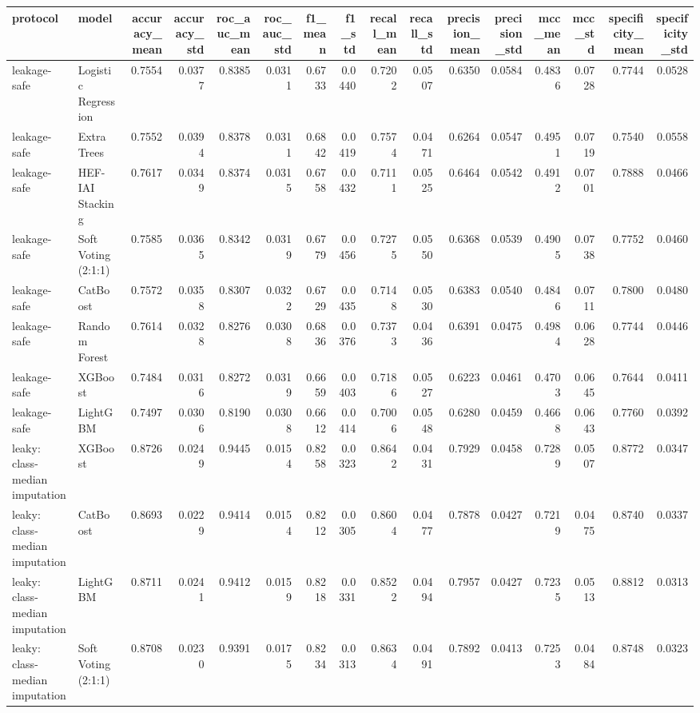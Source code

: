 \begin{tabular}{llrrrrrrrrrrrrrr}
\toprule
protocol & model & accuracy\_mean & accuracy\_std & roc\_auc\_mean & roc\_auc\_std & f1\_mean & f1\_std & recall\_mean & recall\_std & precision\_mean & precision\_std & mcc\_mean & mcc\_std & specificity\_mean & specificity\_std \\
\midrule
leakage-safe & Logistic Regression & 0.7554 & 0.0377 & 0.8385 & 0.0311 & 0.6733 & 0.0440 & 0.7202 & 0.0507 & 0.6350 & 0.0584 & 0.4836 & 0.0728 & 0.7744 & 0.0528 \\
leakage-safe & Extra Trees & 0.7552 & 0.0394 & 0.8378 & 0.0311 & 0.6842 & 0.0419 & 0.7574 & 0.0471 & 0.6264 & 0.0547 & 0.4951 & 0.0719 & 0.7540 & 0.0558 \\
leakage-safe & HEF-IAI Stacking & 0.7617 & 0.0349 & 0.8374 & 0.0315 & 0.6758 & 0.0432 & 0.7111 & 0.0525 & 0.6464 & 0.0542 & 0.4912 & 0.0701 & 0.7888 & 0.0466 \\
leakage-safe & Soft Voting (2:1:1) & 0.7585 & 0.0365 & 0.8342 & 0.0319 & 0.6779 & 0.0456 & 0.7275 & 0.0550 & 0.6368 & 0.0539 & 0.4905 & 0.0738 & 0.7752 & 0.0460 \\
leakage-safe & CatBoost & 0.7572 & 0.0358 & 0.8307 & 0.0322 & 0.6729 & 0.0435 & 0.7148 & 0.0530 & 0.6383 & 0.0540 & 0.4846 & 0.0711 & 0.7800 & 0.0480 \\
leakage-safe & Random Forest & 0.7614 & 0.0328 & 0.8276 & 0.0308 & 0.6836 & 0.0376 & 0.7373 & 0.0436 & 0.6391 & 0.0475 & 0.4984 & 0.0628 & 0.7744 & 0.0446 \\
leakage-safe & XGBoost & 0.7484 & 0.0316 & 0.8272 & 0.0319 & 0.6659 & 0.0403 & 0.7186 & 0.0527 & 0.6223 & 0.0461 & 0.4703 & 0.0645 & 0.7644 & 0.0411 \\
leakage-safe & LightGBM & 0.7497 & 0.0306 & 0.8190 & 0.0308 & 0.6612 & 0.0414 & 0.7006 & 0.0548 & 0.6280 & 0.0459 & 0.4668 & 0.0643 & 0.7760 & 0.0392 \\
leaky: class-median imputation & XGBoost & 0.8726 & 0.0249 & 0.9445 & 0.0154 & 0.8258 & 0.0323 & 0.8642 & 0.0431 & 0.7929 & 0.0458 & 0.7289 & 0.0507 & 0.8772 & 0.0347 \\
leaky: class-median imputation & CatBoost & 0.8693 & 0.0229 & 0.9414 & 0.0154 & 0.8212 & 0.0305 & 0.8604 & 0.0477 & 0.7878 & 0.0427 & 0.7219 & 0.0475 & 0.8740 & 0.0337 \\
leaky: class-median imputation & LightGBM & 0.8711 & 0.0241 & 0.9412 & 0.0159 & 0.8218 & 0.0331 & 0.8522 & 0.0494 & 0.7957 & 0.0427 & 0.7235 & 0.0513 & 0.8812 & 0.0313 \\
leaky: class-median imputation & Soft Voting (2:1:1) & 0.8708 & 0.0230 & 0.9391 & 0.0175 & 0.8234 & 0.0313 & 0.8634 & 0.0491 & 0.7892 & 0.0413 & 0.7253 & 0.0484 & 0.8748 & 0.0323 \\

\end{tabular}
